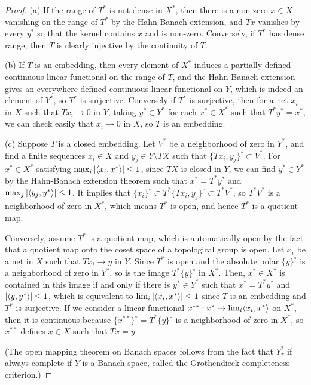 \documentclass{../../large}
\begin{document}
\begin{proof}
(a)
If the range of $T^*$ is not dense in $X^*$, then there is a non-zero $x\in X$ vanishing on the range of $T^*$ by the Hahn-Banach extension, and $Tx$ vanishes by every $y^*$ so that the kernel contains $x$ and is non-zero.
Conversely, if $T^*$ has dense range, then $T$ is clearly injective by the continuity of $T$.

(b)
If $T$ is an embedding, then every element of $X^*$ induces a partially defined continuous linear functional on the range of $T$, and the Hahn-Banach extension gives an everywhere defined continuous linear functional on $Y$, which is indeed an element of $Y^*$, so $T^*$ is surjective.
Conversely if $T^*$ is surjective, then for a net $x_i$ in $X$ such that $Tx_i\to0$ in $Y$, taking $y^*\in Y^*$ for each $x^*\in X^*$ such that $T^*y^*=x^*$, we can check easily that $x_i\to0$ in $X$, so $T$ is an embedding.

(c)
Suppose $T$ is a closed embedding.
Let $V^*$ be a neighborhood of zero in $Y^*$, and find a finite sequences $x_i\in X$ and $y_j\in Y\setminus TX$ such that $\{Tx_i,y_j\}^\circ\subset V^*$.
For $x^*\in X^*$ satisfying $\max_i|\langle x_i,x^*\rangle|\le1$, since $TX$ is closed in $Y$, we can find $y^*\in Y^*$ by the Hahn-Banach extension theorem such that $x^*=T^*y^*$ and $\max_j|\langle y_j,y^*\rangle|\le1$.
It implies that $\{x_i\}^\circ\subset　T^*\{Tx_i,y_j\}^\circ\subset T^*V^*$, so $T^*V^*$ is a neighborhood of zero in $X^*$, which means $T^*$ is open, and hence $T^*$ is a quotient map.

Conversely, assume $T^*$ is a quotient map, which is automatically open by the fact that a quotient map onto the coset space of a topological group is open.
Let $x_i$ be a net in $X$ such that $Tx_i\to y$ in $Y$.
Since $T^*$ is open and the absolute polar $\{y\}^\circ$ is a neighborhood of zero in $Y^*$, so is the image $T^*\{y\}^\circ$ in $X^*$.
Then, $x^*\in X^*$ is contained in this image if and only if there is $y^*\in Y^*$ such that $x^*=T^*y^*$ and $|\langle y,y^*\rangle|\le1$, which is equivalent to $\lim_i|\langle x_i,x^*\rangle|\le1$ since $T$ is an embedding and $T^*$ is surjective.
If we consider a linear functional $x^{**}:x^*\mapsto\lim_i\langle x_i,x^*\rangle$ on $X^*$, then it is continuous because $\{x^{**}\}^\circ=T^*\{y\}^\circ$ is a neighborhood of zero in $X^*$, so $x^{**}$ defines $x\in X$ such that $Tx=y$.


(The open mapping theorem on Banach spaces follows from the fact that $Y^*_\tau$ if always complete if $Y$ is a Banach space, called the Grothendieck completeness criterion.)

\end{proof}
\end{document}
